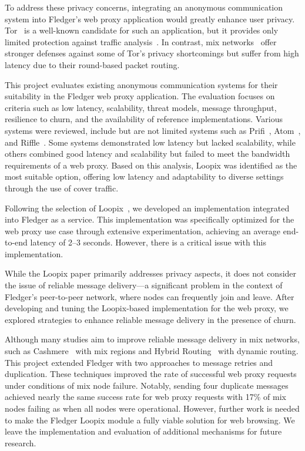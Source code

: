 \documentclass[a4paper,11pt,oneside]{report}
\begin{document}
To address these privacy concerns, integrating an anonymous communication system into Fledger's web proxy application would greatly enhance user privacy. Tor~\cite{tor} is a well-known candidate for such an application, but it provides only limited protection against traffic analysis~\cite{9089497}. In contrast, mix networks~\cite{chaum1981mix} offer stronger defenses against some of Tor's privacy shortcomings but suffer from high latency due to their round-based packet routing.

This project evaluates existing anonymous communication systems for their suitability in the Fledger web proxy application. The evaluation focuses on criteria such as low latency, scalability, threat models, message throughput, resilience to churn, and the availability of reference implementations. Various systems were reviewed, include but are not limited systems such as Prifi~\cite{prifi}, Atom~\cite{atom}, and Riffle~\cite{Riffle}. Some systems demonstrated low latency but lacked scalability, while others combined good latency and scalability but failed to meet the bandwidth requirements of a web proxy. Based on this analysis, Loopix was identified as the most suitable option, offering low latency and adaptability to diverse settings through the use of cover traffic.

Following the selection of Loopix~\cite{loopix}, we developed an implementation integrated into Fledger as a service. This implementation was specifically optimized for the web proxy use case through extensive experimentation, achieving an average end-to-end latency of 2–3 seconds. However, there is a critical issue with this implementation.

While the Loopix paper primarily addresses privacy aspects, it does not consider the issue of reliable message delivery—a significant problem in the context of Fledger’s peer-to-peer network, where nodes can frequently join and leave. After developing and tuning the Loopix-based implementation for the web proxy, we explored strategies to enhance reliable message delivery in the presence of churn.

Although many studies aim to improve reliable message delivery in mix networks, such as Cashmere~\cite{cashmere} with mix regions and Hybrid Routing~\cite{hybrid_routing} with dynamic routing. This project extended Fledger with two approaches to  message retries and duplication. These techniques improved the rate of successful web proxy requests under conditions of mix node failure. Notably, sending four duplicate messages achieved nearly the same success rate for web proxy requests with 17\% of mix nodes failing as when all nodes were operational. However, further work is needed to make the Fledger Loopix module a fully viable solution for web browsing. We leave the implementation and evaluation of additional mechanisms for future research.
\end{document}

